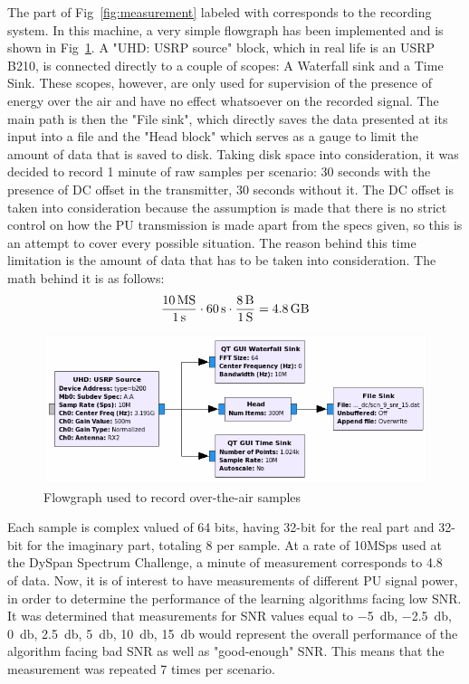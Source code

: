 The part of Fig~\ref{fig:measurement} labeled with  corresponds to the recording system. In this machine, a very simple flowgraph has been implemented and is shown in Fig~\ref{fig:recording_flowgraph}. A "UHD: USRP source" block, which in real life is an \ac{USRP} B210, is connected directly to a couple of scopes: A Waterfall sink and a Time Sink. These scopes, however, are only used for supervision of the presence of energy over the air and have no effect whatsoever on the recorded signal. The main path is then the "File sink", which directly saves the data presented at its input into a file and the "Head block" which serves as a gauge to limit the amount of data that is saved to disk. Taking disk space into consideration, it was decided to record 1 minute of raw samples per scenario: 30 seconds with the presence of DC offset in the transmitter, 30 seconds without it. The DC offset is taken into consideration because the assumption is made that there is no strict control on how the \ac{PU} transmission is made apart from the specs given, so this is an attempt to cover every possible situation. The reason behind this time limitation is the amount of data that has to be taken into consideration. The math behind it is as follows:
\begin{equation}
    \frac{\SI{10}{\mega S}}{\SI{1}{s}} \cdot \SI{60}{s} \cdot \frac{\SI{8}{\byte}}{\SI{1}{S}} = \SI{4.8}{\giga\byte}
\end{equation}

\begin{figure}[!htb]
    \centering
    \includegraphics[width=\textwidth]{figures/recording_flowgraph}
    \caption{Flowgraph used to record over-the-air samples}
    \label{fig:recording_flowgraph}
\end{figure}

Each sample is complex valued of 64 bits, having 32-bit for the real part and 32-bit for the imaginary part, totaling \SI{8}{\byte} per sample. At a rate of 10MSps used at the DySpan Spectrum Challenge, a minute of measurement corresponds to \SI{4.8}{\giga\byte} of data. Now, it is of interest to have measurements of different \ac{PU} signal power, in order to determine the performance of the learning algorithms facing low \ac{SNR}. It was determined that measurements for \ac{SNR} values equal to \SI{-5}{\decibel}, \SI{-2.5}{\decibel}, \SI{0}{\decibel}, \SI{2.5}{\decibel}, \SI{5}{\decibel}, \SI{10}{\decibel}, \SI{15}{\decibel} would represent the overall performance of the algorithm facing bad \ac{SNR} as well as "good-enough" \ac{SNR}. This means that the measurement was repeated 7 times per scenario.


